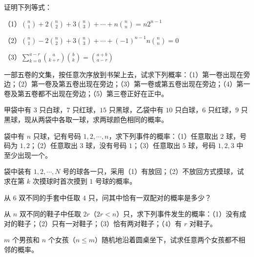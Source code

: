 \documentclass[../../main.tex]{subfiles}
\begin{document}
\begin{exercise}\label{exercise:ch01-08}
证明下列等式：

（1）$\displaystyle\binom{n}{1}+2\binom{n}{2}+3\binom{n}{3}+\cdots+n\binom{n}{n}=n2^{n-1}$

（2）$\displaystyle\binom{n}{1}-2\binom{n}{2}+3\binom{n}{3}+\cdots+(-1)^{n-1}n\binom{n}{n}=0$

（3）$\displaystyle\sum_{k=0}^{a-r}\binom{a}{k+r}\binom{b}{k}=\binom{a+b}{a-r}$
\end{exercise}

\begin{exercise}\label{exercise:ch01-09}
一部五卷的文集，按任意次序放到书架上去，试求下列概率：（1）第一卷出现在旁边；（2）第一卷及第五卷出现在旁边；（3）第一卷或第五卷出现在旁边；（4）第一卷及第五卷都不出现在旁边；（5）第三卷正好在正中。
\end{exercise}

\begin{exercise}\label{exercise:ch01-10}
甲袋中有 $3$ 只白球，$7$ 只红球，$15$ 只黑球，乙袋中有 $10$ 只白球，$6$ 只红球，$9$ 只黑球，现从两袋中各取一球，求两球颜色相同的概率。
\end{exercise}

\begin{exercise}\label{exercise:ch01-11}
袋中有 $n$ 只球，记有号码 $1,2,\cdots,n$，求下列事件的概率：（1）任意取出 $2$ 球，号码为 $1,2$；（2）任意取出 $3$ 球，没有号码 $1$；（3）任意取出 $5$ 球，号码 $1,2,3$ 中至少出现一个。
\end{exercise}

\begin{exercise}\label{exercise:ch01-12}
袋中装有 $1,2,\cdots,N$ 号的球各一只，采用（1）有放回；（2）不放回方式摸球，试求在第 $k$ 次摸球时首次摸到 $1$ 号球的概率。
\end{exercise}

\begin{exercise}\label{exercise:ch01-13}
从 $6$ 双不同的手套中任取 $4$ 只，问其中恰有一双配对的概率是多少？
\end{exercise}

\begin{exercise}\label{exercise:ch01-14}
从 $n$ 双不同的鞋子中任取 $2r$（$2r<n$）只，求下列事件发生的概率：（1）没有成对的鞋子；（2）只有一对鞋子；（3）恰有两对鞋子；（4）有 $r$ 对鞋子。
\end{exercise}

\begin{exercise}\label{exercise:ch01-15}
$m$ 个男孩和 $n$ 个女孩（$n\leqslant m$）随机地沿着圆桌坐下，试求任意两个女孩都不相邻的概率。
\end{exercise}
\end{document}

